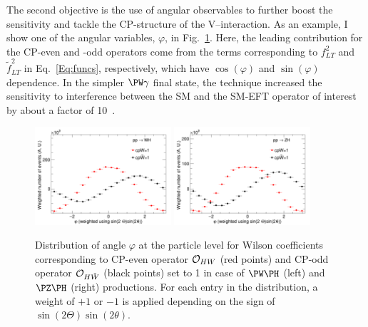 \documentclass[a4paper,11pt]{article}
\renewcommand{\PV}{{{{V}}}\xspace}
\begin{document}
The second objective is the use of
angular observables to further boost the sensitivity and tackle the CP-structure of the \PV--\PH interaction. 
As an example, I show one of the angular variables, $\varphi$, in Fig.~\ref{fig:LHE_phi}. 
Here, the leading contribution for the CP-even and -odd operators come from the terms corresponding to $f^{2}_{LT}$ and $\tilde{f}^2_{LT}$ in Eq.~\eqref{Eq:funcs}, respectively, which have $\cos\left(\varphi\right)$ and $\sin\left(\varphi\right)$ dependence.
In the simpler $\PW\gamma$ final state, the technique increased the sensitivity to interference between the SM and the SM-EFT operator of interest by about a factor of 10~\cite{CMS-PAS-SMP-20-005}.
\begin{figure}[hbtp]
\begin{center}
\includegraphics[width=0.45\textwidth]{Figures/New/LHE/LHE_Plot_phi_WH.png}
\includegraphics[width=0.45\textwidth]{Figures/New/LHE/LHE_Plot_phi_ZH.png}
\end{center}
\caption{
Distribution of angle $\varphi$ at the particle level for Wilson coefficients corresponding to CP-even operator ${\cal O}_{HW}$  (red points) and CP-odd operator ${\cal O}_{H\tilde{W}}$ (black points) set to 1 in case of $\PW\PH$ (left) and $\PZ\PH$ (right) productions.
For each entry in the distribution, a weight of $+1$ or $-1$ is applied depending on the sign of $\sin\left(2\Theta\right) \sin\left(2\theta\right)$. 
}
\label{fig:LHE_phi}
\end{figure}
\end{document}
